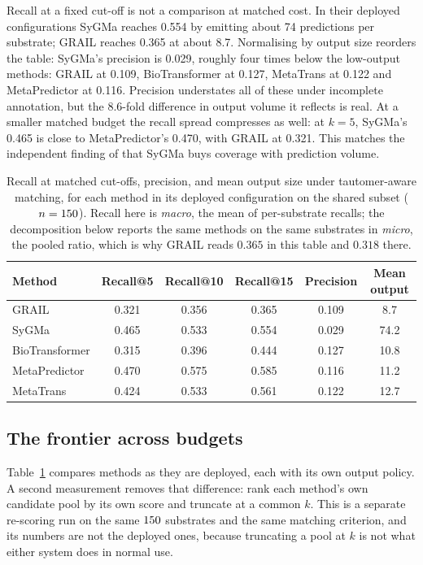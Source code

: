 Recall at a fixed cut-off is not a comparison at matched cost. In their deployed configurations
SyGMa reaches 0.554 by emitting about 74 predictions per substrate; GRAIL reaches 0.365 at about
8.7. Normalising by output size reorders the table: SyGMa's precision is 0.029, roughly four times
below the low-output methods: GRAIL at 0.109, BioTransformer at 0.127, MetaTrans at 0.122 and
MetaPredictor at 0.116. Precision understates all of these under incomplete annotation, but the
8.6-fold difference in output volume it reflects is real. At a smaller matched budget the recall
spread compresses as well: at $k=5$, SyGMa's 0.465 is close to MetaPredictor's 0.470, with GRAIL at
0.321. This matches the independent finding of \citet{Boyce_2022} that SyGMa buys coverage with
prediction volume.

\begin{table}[h]
\centering
\caption{Recall at matched cut-offs, precision, and mean output size under tautomer-aware
matching, for each method in its deployed configuration on the shared subset ($n=150$). Recall
here is \emph{macro}, the mean of per-substrate recalls; the decomposition below reports the same
methods on the same substrates in \emph{micro}, the pooled ratio, which is why GRAIL reads $0.365$
in this table and $0.318$ there.}
\label{tab:budget-matched-leaderboard}
\begin{tabular}{lccccc}
\toprule
Method & Recall@5 & Recall@10 & Recall@15 & Precision & Mean output \\
\midrule
GRAIL & 0.321 & 0.356 & 0.365 & 0.109 & 8.7 \\
SyGMa & 0.465 & 0.533 & 0.554 & 0.029 & 74.2 \\
BioTransformer & 0.315 & 0.396 & 0.444 & 0.127 & 10.8 \\
MetaPredictor & 0.470 & 0.575 & 0.585 & 0.116 & 11.2 \\
MetaTrans & 0.424 & 0.533 & 0.561 & 0.122 & 12.7 \\
\bottomrule
\end{tabular}
\end{table}

\subsection{The frontier across budgets}

Table~\ref{tab:budget-matched-leaderboard} compares methods as they are deployed, each with its own
output policy. A second measurement removes that difference: rank each method's own candidate pool
by its own score and truncate at a common $k$. This is a separate re-scoring run on the same
$150$ substrates and the same matching criterion, and its numbers are not the deployed ones,
because truncating a pool at $k$ is not what either system does in normal use.

